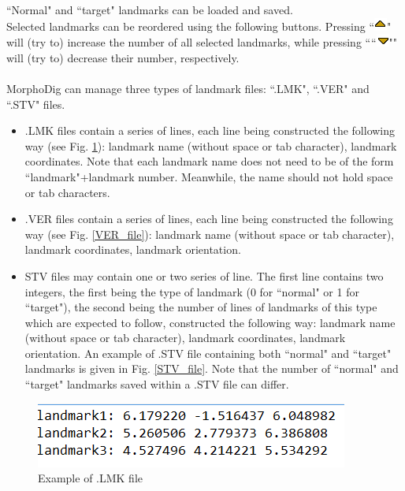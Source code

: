  ``Normal" and ``target" landmarks can be loaded and saved.\\
Selected landmarks can be reordered using the following buttons. Pressing ``\includegraphics[scale=0.7]{images/06/objects/move_up.png}"
will (try to) increase the number of all selected landmarks, while pressing ````\includegraphics[scale=0.7]{images/06/objects/move_down.png}""
will (try to) decrease their number, respectively.\\\\
MorphoDig can manage three types of landmark files: ``.LMK", ``.VER" and ``.STV" files.
\begin{itemize}
\item 
 .LMK files contain a series of lines, each line
being constructed the following way (see Fig. \ref{LMK_file}): landmark
name (without space or tab character),
landmark coordinates. Note that each landmark name does not need to be of the form ``landmark"+landmark number. Meanwhile, the name should not hold space or tab
characters.
\item .VER files contain a series
of lines, each line being
constructed the following
way (see Fig. \ref{VER_file}): landmark name (without space or tab character), landmark coordinates, landmark orientation.
\item STV files may contain one or two series of line. The first line contains two integers, the first being the type of landmark (0 for ``normal" or 1 for ``target"), the second being the number of lines of landmarks of this type which are expected to follow, constructed the following way: landmark name (without space or tab character), landmark coordinates, landmark orientation. An example of .STV file containing both ``normal" and ``target" landmarks is given in Fig. \ref{STV_file}. Note that the number of ``normal" and ``target" landmarks saved within a .STV file can differ.
\end{itemize}
\begin{figure}
  \centering
  \includegraphics[scale=0.5]{images/07/landmarks/LMK_file.png}
 \caption{Example of .LMK file}
\label{LMK_file}
\end{figure}

